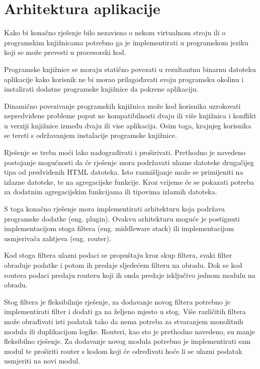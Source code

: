 \documentclass[times, utf8, zavrsni]{fer}
\begin{document}
\section{Arhitektura aplikacije}

Kako bi konačno rješenje bilo nezavisno o nekom virtualnom stroju ili o
programskim knjižnicama potrebno ga je implementirati u programskom jeziku
koji se može prevesti u procesorski kod.

Programske knjižnice se moraju statično povezati u rezultantnu binarnu
datoteku aplikacije kako korisnik ne bi morao prilagođavati svoju programsku
okolinu i instalirati dodatne programske knjižnice da pokrene aplikaciju.

Dinamično povezivanje programskih knjižnica može kod korisnika uzrokovati
nepredviđene probleme poput ne kompatibilnosti dvaju ili više knjižnica i
konflikt u verziji knjižnice između dvaju ili vise aplikacija. Osim toga,
krajnjeg korisnika se tereti s održavanjem instalacije programske knjižnice.

Rješenje se treba moći lako nadograđivati i proširivati. Prethodno je navedeno
postojanje mogućnosti da će rješenje mora podržavati ulazne datoteke
drugačijeg tipa od predviđenih HTML datoteka. Isto razmišljanje može se
primijeniti na izlazne datoteke, te na agregacijske funkcije. Kroz vrijeme će
se pokazati potreba za dodatnim agregacijskim funkcijama ili tipovima izlaznih
datoteka.

S toga konačno rješenje mora implementirati arhitekturu koja
podržava programske dodatke \cite{plugin_architecture_wiki}
(eng. plugin). Ovakvu arhitekturu moguće je
postignuti implementacijom stoga filtera \cite{middleware_wiki}
(eng. middleware stack) ili
implementacijom usmjerivača zahtjeva \cite{router_arhitecture_ieee}
(eng. router).

Kod stoga filtera ulazni podaci se propuštaju kroz skup filtera, svaki filter
obraduje podatke i potom ih predaje sljedećem filteru na obradu. Dok se kod
routera podaci predaju routeru koji ih onda predaje isključivo jednom modulu na
obradu.

Stog filtera je fleksibilnije rješenje, za dodavanje novog filtera potrebno
je implementirati filter i dodati ga na željeno mjesto u stog. Više različitih
filtera može obrađivati isti podatak tako da nema potreba za stvaranjem
monolitnih modula ili duplikacijom logike. Routeri, kao sto je prethodno
navedeno, su manje fleksibilno rješenje. Za dodavanje novog modula potrebno je
implementirati sam modul te proširiti router s kodom koji će određivati hoće li
se ulazni podatak usmjeriti na novi modul.
\end{document}

